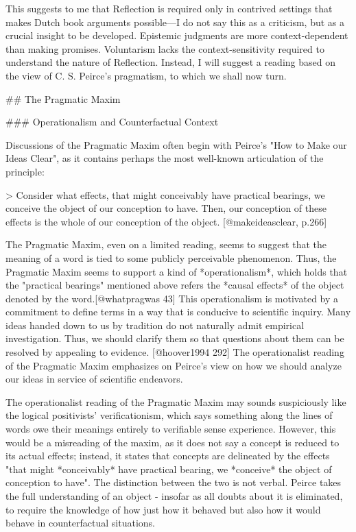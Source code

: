 This suggests to me that Reflection is required only in contrived
settings that makes Dutch book arguments possible---I do not say this as
a criticism, but as a crucial insight to be developed. Epistemic
judgments are more context-dependent than making promises. Voluntarism
lacks the context-sensitivity required to understand the nature of
Reflection. Instead, I will suggest a reading based on the view of C. S.
Peirce's pragmatism, to which we shall now turn.

\#\# The Pragmatic Maxim

\#\#\# Operationalism and Counterfactual Context

Discussions of the Pragmatic Maxim often begin with Peirce's "How to
Make our Ideas Clear", as it contains perhaps the most well-known
articulation of the principle:

\textgreater{} Consider what effects, that might conceivably have
practical bearings, we conceive the object of our conception to have.
Then, our conception of these effects is the whole of our conception of
the object. {[}@makeideasclear, p.266{]}

The Pragmatic Maxim, even on a limited reading, seems to suggest that
the meaning of a word is tied to some publicly perceivable phenomenon.
Thus, the Pragmatic Maxim seems to support a kind of *operationalism*,
which holds that the "practical bearings" mentioned above refers the
*causal effects* of the object denoted by the word.{[}@whatpragwas 43{]}
This operationalism is motivated by a commitment to define terms in a
way that is conducive to scientific inquiry. Many ideas handed down to
us by tradition do not naturally admit empirical investigation. Thus, we
should clarify them so that questions about them can be resolved by
appealing to evidence. {[}@hoover1994 292{]} The operationalist reading
of the Pragmatic Maxim emphasizes on Peirce's view on how we should
analyze our ideas in service of scientific endeavors.

The operationalist reading of the Pragmatic Maxim may sounds
suspiciously like the logical positivists' verificationism, which says
something along the lines of words owe their meanings entirely to
verifiable sense experience. However, this would be a misreading of the
maxim, as it does not say a concept is reduced to its actual effects;
instead, it states that concepts are delineated by the effects "that
might *conceivably* have practical bearing, we *conceive* the object of
conception to have". The distinction between the two is not verbal.
Peirce takes the full understanding of an object - insofar as all doubts
about it is eliminated, to require the knowledge of how just how it
behaved but also how it would behave in counterfactual situations.

